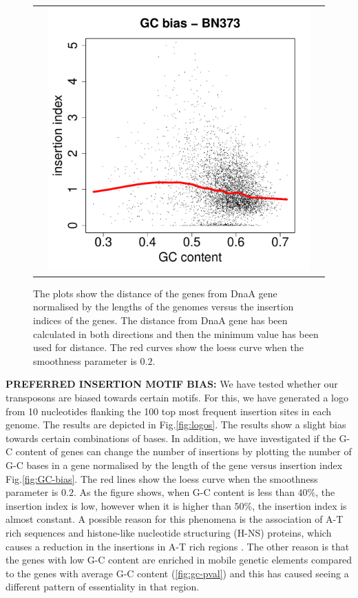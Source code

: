 \documentclass[12pt,letterpaper]{article}
\begin{document}
\begin{figure}
\begin{tabular}{c c c}
&\includegraphics[page=38, scale=0.25]{biases.pdf}&\\
\end{tabular}
\caption{The plots show the distance of the genes from DnaA gene normalised by the lengths of the genomes versus the insertion indices of the genes. The distance from DnaA gene has been calculated in both directions and then the minimum value has been used for distance. The red curves show the loess curve when the smoothness parameter is $0.2$.}
\label{fig:distance-bias}
\end{figure}

{\bf PREFERRED INSERTION MOTIF BIAS:} We have tested whether our transposons are biased towards certain motifs. For this, we have generated a logo from 10 nucleotides flanking the 100 top most frequent insertion sites in each genome. The results are depicted in Fig.\@  \ref{fig:logos}. The results show a slight bias towards certain combinations of bases. In addition, we have investigated if the G-C content of genes can change the number of insertions by plotting the number of G-C bases in a gene normalised by the length of the gene versus insertion index Fig.\@  \ref{fig:GC-bias}. The red lines show the loess curve when the smoothness parameter is $0.2$. As the figure shows, when G-C content is less than $40\%$, the insertion index is low, however when it is higher than $50\%$, the insertion index is almost constant. A possible reason for this phenomena is the association of A-T rich sequences and histone-like nucleotide structuring (H-NS) proteins, which causes a reduction in the insertions in A-T rich regions \cite{kimura_nucleoid_2016}. The other reason is that the genes with low G-C content are enriched in mobile genetic elements compared to the genes with average G-C content (\ref{fig:gc-pval}) and this has caused seeing a different pattern of essentiality in that region.
\end{document}
